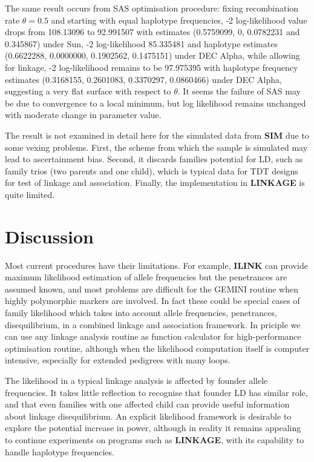 The same result occurs from SAS optimisation procedure:  fixing recombination
rate $\theta=0.5$ and starting with equal haplotype frequencies, -2
log-likelihood value drops from 108.13096 to 92.991507 with estimates
(0.5759099, 0, 0.0782231 and 0.345867) under Sun, -2 log-likelihood 85.335481
and haplotype estimates (0.6622288, 0.0000000, 0.1902562, 0.1475151) under DEC
Alpha, while allowing for linkage, -2 log-likelihood remains to be 97.975395
with haplotype frequency estimates (0.3168155, 0.2601083, 0.3370297, 0.0860466)
under DEC Alpha, suggesting a very flat surface with respect to $\theta$.  It
seems the failure of SAS may be due to convergence to a local minimum, but log
likelihood remains unchanged with moderate change in parameter value.

The result is not examined in detail here for the simulated data from {\bf
SIM} due to some vexing problems.  First, the scheme from which the sample is
simulated may lead to ascertainment bias.  Second, it discards families
potential for LD, such as family trios (two parents and one child), which is
typical data for TDT designs for test of linkage and association.  Finally, the
implementation in {\bf LINKAGE} is quite limited.


\section{Discussion}

Most current procedures have their limitations.  For example, {\bf ILINK} can
provide maximum likelihood estimation of allele frequencies but the penetrances
are assumed known, and most problems are difficult for the GEMINI routine when
highly polymorphic markers are involved.  In fact these could be special cases
of family likelihood which takes into account allele frequencies, penetrances,
disequilibrium, in a combined linkage and association framework.  In priciple
we can use any linkage analysis routine as function calculator for
high-performance optimisation routine, although when the likelihood computation
itself is computer intensive, especially for extended pedigrees with many
loops.

The likelihood in a typical linkage analysis is affected by founder allele
frequencies.  It takes little reflection to recognise that founder LD has
similar role, and that even families with one affected child can provide useful
information about linkage disequilibrium.  An explicit likelihood framework is
desirable to explore the potential increase in power, although in reality it
remains appealing to continue experiments on programs such as {\bf LINKAGE},
with its capability to handle haplotype frequencies.

